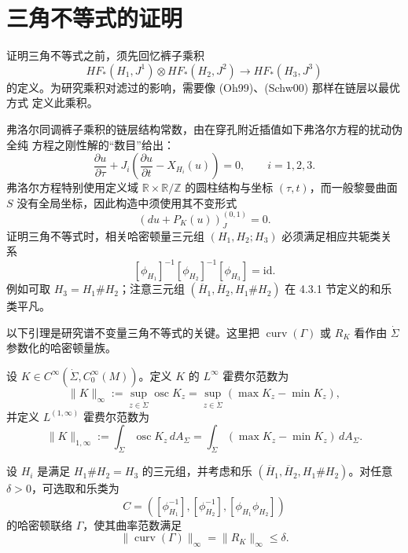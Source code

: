 \section{三角不等式的证明}
\label{sec:proof-spectral-triangle-inequality}

证明三角不等式之前，须先回忆裤子乘积
\[
 HF_*(H_1,J^1)\otimes HF_*(H_2,J^2)\longrightarrow HF_*(H_3,J^3)
\]
的定义。为研究乘积对滤过的影响，需要像 (Oh99)、(Schw00) 那样在链层以最优方式
定义此乘积。

弗洛尔同调裤子乘积的链层结构常数，由在穿孔附近插值如下弗洛尔方程的扰动伪全纯
方程之刚性解的“数目”给出：
\[
 \frac{\partial u}{\partial\tau}
 +J_i\left(\frac{\partial u}{\partial t}-X_{H_i}(u)\right)=0,
 \qquad i=1,2,3.
\]
弗洛尔方程特别使用定义域 $\mathbb R\times\mathbb R/\mathbb Z$ 的圆柱结构与坐标
$(\tau,t)$，而一般黎曼曲面 $S$ 没有全局坐标，因此构造中须使用其不变形式
\[
 (du+P_K(u))_J^{(0,1)}=0.
\]
证明三角不等式时，相关哈密顿量三元组 $(H_1,H_2;H_3)$ 必须满足相应共轭类关系
\[
 [\phi_{H_1}]^{-1}[\phi_{H_2}]^{-1}[\phi_{H_3}]=\mathrm{id}.
\]
例如可取 $H_3=H_1\#H_2$；注意三元组
$(\overline H_1,\overline H_2,H_1\#H_2)$ 在 4.3.1 节定义的和乐类平凡。

以下引理是研究谱不变量三角不等式的关键。这里把
$\operatorname{curv}(\Gamma)$ 或 $R_K$ 看作由 $\dot\Sigma$ 参数化的哈密顿量族。

\begin{definition}
\label{def:21-hofer-norm-family}
设 $K\in C^\infty(\dot\Sigma,C_0^\infty(M))$。定义 $K$ 的 $L^\infty$ 霍费尔范数为
\begin{equation}
 \lVert K\rVert_\infty:=\sup_{z\in\dot\Sigma}\operatorname{osc}K_z
 =\sup_{z\in\dot\Sigma}(\max K_z-\min K_z),
 \label{eq:21-linfty-hofer-family}
\end{equation}
并定义 $L^{(1,\infty)}$ 霍费尔范数为
\begin{equation}
 \lVert K\rVert_{1,\infty}:=
 \int_{\dot\Sigma}\operatorname{osc}K_z\,dA_\Sigma
 =\int_{\dot\Sigma}(\max K_z-\min K_z)\,dA_\Sigma.
 \label{eq:21-loneinfty-hofer-family}
\end{equation}
\end{definition}

\begin{lemma}
\label{lem:21-small-curvature-connection}
设 $H_i$ 是满足 $H_1\#H_2=H_3$ 的三元组，并考虑和乐
$(\overline H_1,\overline H_2,H_1\#H_2)$。对任意 $\delta>0$，可选取和乐类为
\[
 C=([\phi_{H_1}^{-1}],[\phi_{H_2}^{-1}],[\phi_{H_1}\phi_{H_2}])
\]
的哈密顿联络 $\Gamma$，使其曲率范数满足
\[
 \lVert\operatorname{curv}(\Gamma)\rVert_\infty
 =\lVert R_K\rVert_\infty\leq\delta.
\]
\end{lemma}

